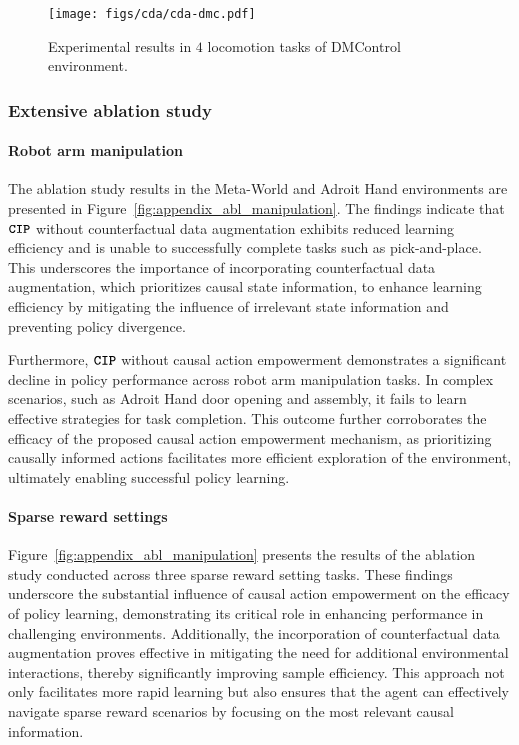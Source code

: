 \begin{figure}[t]
    \centering
    \texttt{[image: figs/cda/cda-dmc.pdf]}
    \caption{Experimental results in $4$ locomotion tasks of DMControl environment.}
    \label{fig:cda_dmc}
\end{figure}

\subsubsection{Extensive ablation study}
\paragraph{Robot arm manipulation}

The ablation study results in the Meta-World and Adroit Hand environments are presented in Figure~\ref{fig:appendix_abl_manipulation}. The findings indicate that $\texttt{\textbf{CIP}}$ without counterfactual data augmentation exhibits reduced learning efficiency and is unable to successfully complete tasks such as pick-and-place. This underscores the importance of incorporating counterfactual data augmentation, which prioritizes causal state information, to enhance learning efficiency by mitigating the influence of irrelevant state information and preventing policy divergence.

Furthermore, $\texttt{\textbf{CIP}}$ without causal action empowerment demonstrates a significant decline in policy performance across robot arm manipulation tasks. In complex scenarios, such as Adroit Hand door opening and assembly, it fails to learn effective strategies for task completion. This outcome further corroborates the efficacy of the proposed causal action empowerment mechanism, as prioritizing causally informed actions facilitates more efficient exploration of the environment, ultimately enabling successful policy learning.

\paragraph{Sparse reward settings}
Figure~\ref{fig:appendix_abl_manipulation} presents the results of the ablation study conducted across three sparse reward setting tasks. These findings underscore the substantial influence of causal action empowerment on the efficacy of policy learning, demonstrating its critical role in enhancing performance in challenging environments. Additionally, the incorporation of counterfactual data augmentation proves effective in mitigating the need for additional environmental interactions, thereby significantly improving sample efficiency. This approach not only facilitates more rapid learning but also ensures that the agent can effectively navigate sparse reward scenarios by focusing on the most relevant causal information. 

